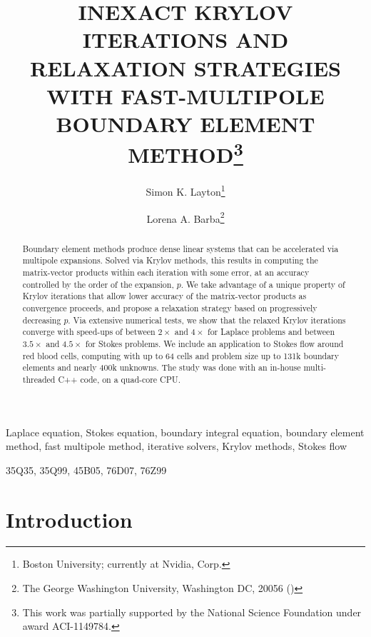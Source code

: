 \documentclass[final,leqno,]{siamltex1213}
\title{INEXACT KRYLOV ITERATIONS AND RELAXATION STRATEGIES WITH FAST-MULTIPOLE BOUNDARY ELEMENT METHOD\thanks{This work was partially supported by the National Science Foundation under award ACI-1149784.}}
\author{Simon K. Layton\thanks{Boston University; currently at Nvidia, Corp.}
\and Lorena A. Barba\thanks{The George Washington University, Washington DC, 20056 
(\email{labarba@gwu.edu})}}
\begin{document}
\maketitle

\begin{abstract}
Boundary element methods produce dense linear systems that can be accelerated via multipole expansions. Solved via Krylov methods, this results in computing the matrix-vector products within each iteration with some error, at an accuracy controlled by the order of the expansion, $p$. We take advantage of a unique property of Krylov iterations that allow lower accuracy of the matrix-vector products as convergence proceeds, and propose a relaxation strategy based on progressively decreasing $p$. Via extensive numerical tests, we show that the relaxed Krylov iterations converge with speed-ups of between $2\times$ and $4\times$ for Laplace problems and between $3.5\times$ and $4.5\times$ for Stokes problems. We include an application to Stokes flow around red blood cells, computing with up to 64 cells and problem size up to 131k boundary elements and nearly 400k unknowns. The study was done with an in-house multi-threaded C++ code, on a quad-core CPU. 
\end{abstract}

\begin{keywords}Laplace equation, Stokes equation, boundary integral equation, boundary element method, fast multipole method, iterative solvers, Krylov methods, Stokes flow\end{keywords}

\begin{AMS}35Q35, 35Q99, 45B05, 76D07, 76Z99\end{AMS}


\pagestyle{myheadings}
\thispagestyle{plain}

\section{Introduction}
\end{document}
